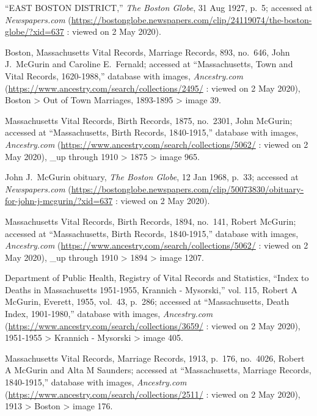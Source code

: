 \begin{thebibliography}{999}
	``EAST BOSTON DISTRICT,'' \textit{The Boston Globe}, 31 Aug 1927, p.\ 5; accessed at \textit{Newspapers.com} (\url{https://bostonglobe.newspapers.com/clip/24119074/the-boston-globe/?xid=637} : viewed on 2 May 2020).	
	
	Boston, Massachusetts Vital Records, Marriage Records, 893, no.\ 646, John J.\ McGurin and Caroline E.\ Fernald; accessed at ``Massachusetts, Town and Vital Records, 1620-1988,'' database with images, \textit{Ancestry.com} (\url{https://www.ancestry.com/search/collections/2495/} : viewed on 2 May 2020), Boston > Out of Town Marriages, 1893-1895 > image 39.
	
	Massachusetts Vital Records, Birth Records, 1875, no.\ 2301, John McGurin; accessed at ``Massachusetts, Birth Records, 1840-1915,'' database with images, \textit{Ancestry.com} (\url{https://www.ancestry.com/search/collections/5062/} : viewed on 2 May 2020), \_up through 1910 > 1875 > image 965.
	
	John J.\ McGurin obituary, \textit{The Boston Globe}, 12 Jan 1968, p.\ 33; accessed at \textit{Newspapers.com} (\url{https://bostonglobe.newspapers.com/clip/50073830/obituary-for-john-j-mcgurin/?xid=637} : viewed on 2 May 2020).
	
	Massachusetts Vital Records, Birth Records, 1894, no.\ 141, Robert McGurin; accessed at ``Massachusetts, Birth Records, 1840-1915,'' database with images, \textit{Ancestry.com} (\url{https://www.ancestry.com/search/collections/5062/} : viewed on 2 May 2020), \_up through 1910 > 1894 > image 1207.	
	
	Department of Public Health, Registry of Vital Records and Statistics, ``Index to Deaths in Massachusetts 1951-1955, Krannich - Mysorski,'' vol. 115, Robert A McGurin, Everett, 1955, vol.\ 43, p.\ 286; accessed at ``Massachusetts, Death Index, 1901-1980,'' database with images, \textit{Ancestry.com} (\url{https://www.ancestry.com/search/collections/3659/} : viewed on 2 May 2020), 1951-1955 > Krannich - Mysorski > image 405.
	
	Massachusetts Vital Records, Marriage Records, 1913, p.\ 176, no.\ 4026, Robert A McGurin and Alta M Saunders; accessed at ``Massachusetts, Marriage Records, 1840-1915,'' database with images, \textit{Ancestry.com} (\url{https://www.ancestry.com/search/collections/2511/} : viewed on 2 May 2020), 1913 > Boston > image 176.
	

\end{thebibliography}
